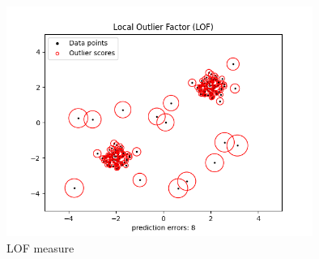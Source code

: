 \begin{figure}[h!tb]
	\centering
	
	\includegraphics[width=10cm]{fig/LOF_measure} %
	
	\caption[Local outlier measure]{LOF measure}
	\label{Figure-LOF_measure} 
\end{figure}

